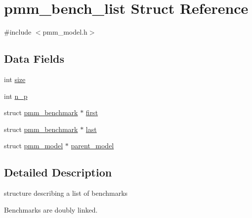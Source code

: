 \hypertarget{structpmm__bench__list}{\section{pmm\-\_\-bench\-\_\-list Struct Reference}
\label{structpmm__bench__list}
}


{\ttfamily \#include $<$pmm\-\_\-model.\-h$>$}

\subsection*{Data Fields}
\begin{DoxyCompactItemize}
\item 
int \hyperlink{structpmm__bench__list_ad7b85549cd25a24eebbd006550000a80}{size}
\item 
int \hyperlink{structpmm__bench__list_acacb1e1d72f7a09dfb9ce27a004c4102}{n\-\_\-p}
\item 
struct \hyperlink{structpmm__benchmark}{pmm\-\_\-benchmark} $\ast$ \hyperlink{structpmm__bench__list_a63421cdb338bd9338f4cab9c3ed77fc3}{first}
\item 
struct \hyperlink{structpmm__benchmark}{pmm\-\_\-benchmark} $\ast$ \hyperlink{structpmm__bench__list_a0ef262381d4de06ad02c939a86580c06}{last}
\item 
struct \hyperlink{structpmm__model}{pmm\-\_\-model} $\ast$ \hyperlink{structpmm__bench__list_a597ed45b5cb3c41c5e86669ebaceca8a}{parent\-\_\-model}
\end{DoxyCompactItemize}


\subsection{Detailed Description}
structure describing a list of benchmarks

Benchmarks are doubly linked. 

